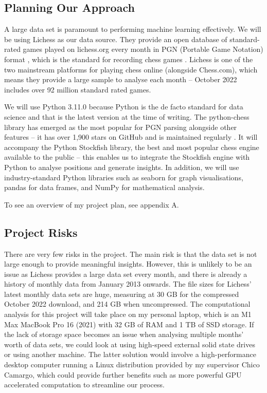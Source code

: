 \documentclass[%
 superscriptaddress,
showpacs,preprintnumbers,
 amsmath,
 amssymb,
 aps,
 pra,
showkeys,
onecolumn,
notitlepage,
11pt,
tightenlines      %
]{revtex4-1}
\begin{document}
\subsection{Planning Our Approach}
A large data set is paramount to performing machine learning effectively. We will be using Lichess as our data source. They provide an open database of standard-rated games played on lichess.org every month in PGN (Portable Game Notation) format \cite{lichessOpenDatabase}, which is the standard for recording chess games \cite{pgnExplanation}. Lichess is one of the two mainstream platforms for playing chess online (alongside Chess.com), which means they provide a large sample to analyse each month -- October 2022 includes over 92 million standard rated games.

We will use Python 3.11.0 because Python is the de facto standard for data science \cite{pythonForDataScience} and that is the latest version at the time of writing. The python-chess library has emerged as the most popular for PGN parsing alongside other features -- it has over 1,900 stars on GitHub and is maintained regularly \cite{pythonChessLibrary}. It will accompany the Python Stockfish library, the best and most popular chess engine available to the public \cite{aboutStockfish} -- this enables us to integrate the Stockfish engine with Python to analyse positions and generate insights. In addition, we will use industry-standard Python libraries such as seaborn for graph visualisations, pandas for data frames, and NumPy for mathematical analysis.

To see an overview of my project plan, see appendix A.

\subsection{Project Risks}
There are very few risks in the project. The main risk is that the data set is not large enough to provide meaningful insights. However, this is unlikely to be an issue as Lichess provides a large data set every month, and there is already a history of monthly data from January 2013 onwards. The file sizes for Lichess' latest monthly data sets are huge, measuring at 30 GB for the compressed October 2022 download, and 214 GB when uncompressed. The computational analysis for this project will take place on my personal laptop, which is an M1 Max MacBook Pro 16 (2021) with 32 GB of RAM and 1 TB of SSD storage. If the lack of storage space becomes an issue when analysing multiple months' worth of data sets, we could look at using high-speed external solid state drives or using another machine. The latter solution would involve a high-performance desktop computer running a Linux distribution provided by my supervisor Chico Camargo, which could provide further benefits such as more powerful GPU accelerated computation to streamline our process.
\end{document}
